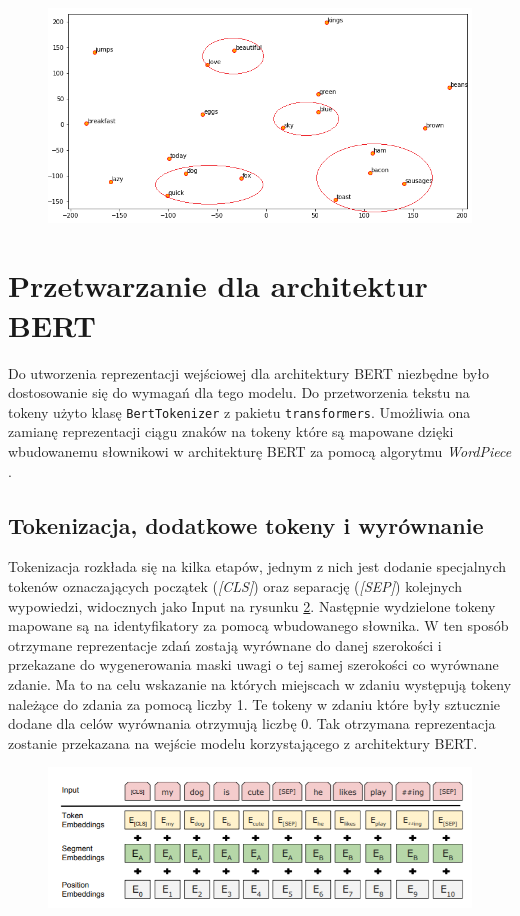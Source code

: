 \begin{figure}[t]
\centering\includegraphics[width=\textwidth]{figures/visualize_glove.png}
\label{rys:visualize_glove}
\end{figure}

\section{Przetwarzanie dla architektur BERT}

Do utworzenia reprezentacji wejściowej dla architektury BERT niezbędne było dostosowanie się do wymagań dla tego modelu. Do przetworzenia tekstu na tokeny użyto klasę \texttt{BertTokenizer} z pakietu \texttt{transformers}. Umożliwia ona zamianę reprezentacji ciągu znaków na tokeny które są mapowane dzięki wbudowanemu słownikowi w architekturę BERT za pomocą algorytmu \textit{WordPiece} \cite{wu2016googles}.

\subsection{Tokenizacja, dodatkowe tokeny i wyrównanie}

Tokenizacja rozkłada się na kilka etapów, jednym z nich jest dodanie specjalnych tokenów oznaczających początek (\textit{[CLS]}) oraz separację (\textit{[SEP]}) kolejnych wypowiedzi, widocznych jako Input na rysunku \ref{rys:bert_token}. Następnie wydzielone tokeny mapowane są na identyfikatory za pomocą wbudowanego słownika. W ten sposób otrzymane reprezentacje zdań zostają wyrównane do danej szerokości i przekazane do wygenerowania maski uwagi o tej samej szerokości co wyrównane zdanie. Ma to na celu wskazanie na których miejscach w zdaniu występują tokeny należące do zdania za pomocą liczby 1. Te tokeny w zdaniu które były sztucznie dodane dla celów wyrównania otrzymują liczbę 0. Tak otrzymana reprezentacja zostanie przekazana na wejście modelu korzystającego z architektury BERT.

\begin{figure}[t]
\centering\includegraphics[width=\textwidth]{figures/bert_token.png}
\label{rys:bert_token}
\end{figure}
